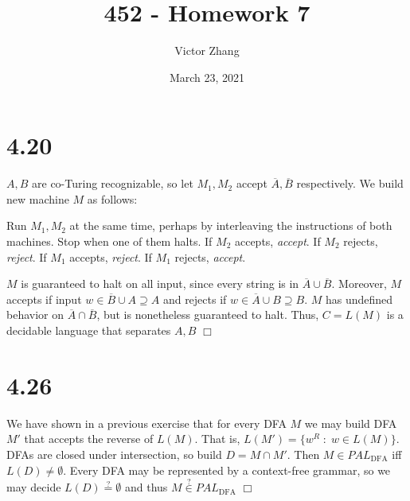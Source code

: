 \documentclass{article}
\title{452 - Homework 7}
\author{Victor Zhang}
\date{March 23, 2021}
\newenvironment{myindentpar}[1]
  {\begin{list}{}
          {\setlength{\leftmargin}{#1}
          \setlength{\rightmargin}{#1}}
          \item[]
  }
  {\end{list}}
\begin{document}
\maketitle

\section*{4.20}
$A,B$ are co-Turing recognizable, so let $M_1,M_2$ accept $\overline{A},\overline{B}$ respectively. We build new machine $M$ as follows:
\begin{myindentpar}{1em}
Run $M_1,M_2$ at the same time, perhaps by interleaving the instructions of both machines. Stop when one of them halts. If $M_2$ accepts, \textit{accept}. If $M_2$ rejects, \textit{reject}. If $M_1$ accepts, \textit{reject}. If $M_1$ rejects, \textit{accept}.
\end{myindentpar}
$M$ is guaranteed to halt on all input, since every string is in $\overline{A} \cup \overline{B}$. Moreover, $M$ accepts if input $w \in \overline{B} \cup A \supseteq A$ and rejects if $w \in \overline{A} \cup B \supseteq B$. $M$ has undefined behavior on $\overline{A} \cap \overline{B}$, but is nonetheless guaranteed to halt. Thus, $C = L(M)$ is a decidable language that separates $A,B$ $\Box$

\section*{4.26}
We have shown in a previous exercise that for every DFA $M$ we may build DFA $M'$ that accepts the reverse of $L(M)$. That is, $L(M') = \{w^R \;:\; w \in L(M)\}$. DFAs are closed under intersection, so build $D = M \cap M'$. Then $M \in PAL_{\mathrm{DFA}}$ iff $L(D) \neq \emptyset$. Every DFA may be represented by a context-free grammar, so we may decide $L(D) \overset{?}{=} \emptyset$ and thus $M \overset{?}{\in} PAL_{\mathrm{DFA}}$ $\Box$
\end{document}
